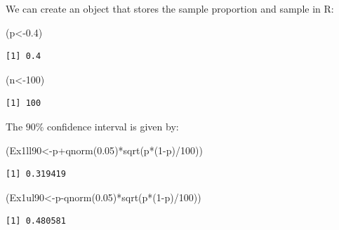\documentclass[
  letterpaper,
  DIV=11,
  numbers=noendperiod]{scrreprt}
\newenvironment{Shaded}{\begin{snugshade}}{\end{snugshade}}
\newcommand{\DecValTok}[1]{\textcolor[rgb]{0.68,0.00,0.00}{#1}}
\newcommand{\FloatTok}[1]{\textcolor[rgb]{0.68,0.00,0.00}{#1}}
\newcommand{\FunctionTok}[1]{\textcolor[rgb]{0.28,0.35,0.67}{#1}}
\newcommand{\NormalTok}[1]{\textcolor[rgb]{0.00,0.23,0.31}{#1}}
\newcommand{\OtherTok}[1]{\textcolor[rgb]{0.00,0.23,0.31}{#1}}
\newcommand{\SpecialCharTok}[1]{\textcolor[rgb]{0.37,0.37,0.37}{#1}}
\begin{document}
We can create an object that stores the sample proportion and sample in
R:

\begin{Shaded}
\begin{Highlighting}[numbers=left,,]
\NormalTok{(p}\OtherTok{\textless{}{-}}\FloatTok{0.4}\NormalTok{)}
\end{Highlighting}
\end{Shaded}

\begin{verbatim}
[1] 0.4
\end{verbatim}

\begin{Shaded}
\begin{Highlighting}[numbers=left,,]
\NormalTok{(n}\OtherTok{\textless{}{-}}\DecValTok{100}\NormalTok{)}
\end{Highlighting}
\end{Shaded}

\begin{verbatim}
[1] 100
\end{verbatim}

The \(90\)\% confidence interval is given by:

\begin{Shaded}
\begin{Highlighting}[numbers=left,,]
\NormalTok{(Ex1ll90}\OtherTok{\textless{}{-}}\NormalTok{p}\SpecialCharTok{+}\FunctionTok{qnorm}\NormalTok{(}\FloatTok{0.05}\NormalTok{)}\SpecialCharTok{*}\FunctionTok{sqrt}\NormalTok{(p}\SpecialCharTok{*}\NormalTok{(}\DecValTok{1}\SpecialCharTok{{-}}\NormalTok{p)}\SpecialCharTok{/}\DecValTok{100}\NormalTok{))}
\end{Highlighting}
\end{Shaded}

\begin{verbatim}
[1] 0.319419
\end{verbatim}

\begin{Shaded}
\begin{Highlighting}[numbers=left,,]
\NormalTok{(Ex1ul90}\OtherTok{\textless{}{-}}\NormalTok{p}\SpecialCharTok{{-}}\FunctionTok{qnorm}\NormalTok{(}\FloatTok{0.05}\NormalTok{)}\SpecialCharTok{*}\FunctionTok{sqrt}\NormalTok{(p}\SpecialCharTok{*}\NormalTok{(}\DecValTok{1}\SpecialCharTok{{-}}\NormalTok{p)}\SpecialCharTok{/}\DecValTok{100}\NormalTok{))}
\end{Highlighting}
\end{Shaded}

\begin{verbatim}
[1] 0.480581
\end{verbatim}
\end{document}
